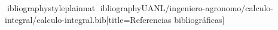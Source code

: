 \documentclass[spanish,letterpaper,oneside]{article}
\begin{document}
\hypersetup{pageanchor=false}
\begingroup
\fontsize{14}{17}\selectfont
\renewcommand{\Huge}{\fontsize{14}{17}\selectfont\bfseries}
\renewcommand{\large}{\fontsize{14}{17}\selectfont}
\templatePortrait
\clearpage
\endgroup
\hypersetup{pageanchor=true}
\templatePagecfg
\singlespacing
\setlength{\tabcolsep}{8pt}
\renewcommand{\arraystretch}{1.18}



\newpage
ibliographystyle{plainnat}
ibliography{UANL/ingeniero-agronomo/calculo-integral/calculo-integral.bib}[title={Referencias bibliográficas}]
\end{document}
